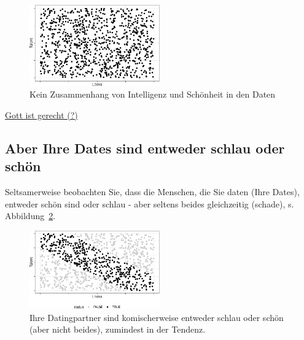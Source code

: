 \documentclass[
  a4paper,
  DIV=11]{scrreprt}
\theoremstyle{definition}
\theoremstyle{remark}
\begin{document}
\begin{figure}

{\centering \includegraphics[width=0.5\textwidth,height=\textheight]{./kausal_files/figure-pdf/fig-iq-schoen-1.pdf}

}

\caption{\label{fig-iq-schoen}Kein Zusammenhang von Intelligenz und
Schönheit in den Daten}

\end{figure}

\href{https://twitter.com/TheTweetOfGod/status/1462594155176026123}{Gott
ist gerecht (?)}

\hypertarget{aber-ihre-dates-sind-entweder-schlau-oder-schuxf6n}{%
\subsection{Aber Ihre Dates sind entweder schlau oder
schön}\label{aber-ihre-dates-sind-entweder-schlau-oder-schuxf6n}}

Seltsamerweise beobachten Sie, dass die Menschen, die Sie daten (Ihre
Dates), entweder schön sind oder schlau - aber seltens beides
gleichzeitig (schade), s. Abbildung~\ref{fig-dates-beauty}.

\begin{figure}

{\centering \includegraphics[width=0.5\textwidth,height=\textheight]{./kausal_files/figure-pdf/fig-dates-beauty-1.pdf}

}

\caption{\label{fig-dates-beauty}Ihre Datingpartner sind komischerweise
entweder schlau oder schön (aber nicht beides), zumindest in der
Tendenz.}

\end{figure}
\end{document}
